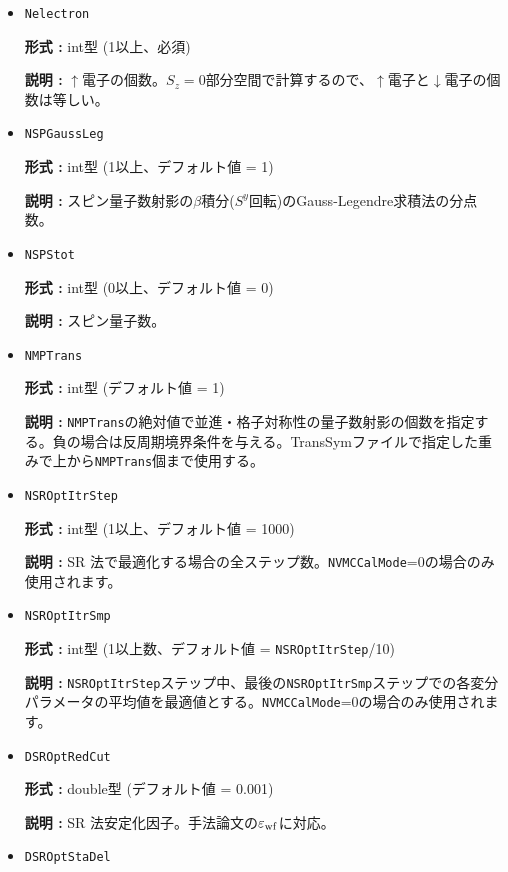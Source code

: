 \begin{itemize}
{\bf 説明 :} サイト数を指定する整数。  

\item  \verb|Nelectron|

{\bf 形式 :} {int型 (1以上、必須)}

{\bf 説明 :} $\uparrow$電子の個数。$S_z=0$部分空間で計算するので、$\uparrow$電子と$\downarrow$電子の個数は等しい。

 \item  \verb|NSPGaussLeg|

{\bf 形式 :} {int型 (1以上、デフォルト値 = 1)}

{\bf 説明 :} スピン量子数射影の$\beta$積分($S^y$回転)のGauss-Legendre求積法の分点数。

 \item  \verb|NSPStot|

{\bf 形式 :} int型 (0以上、デフォルト値 = 0)

{\bf 説明 :}  スピン量子数。

 \item  \verb|NMPTrans|

{\bf 形式 :} int型 (デフォルト値 = 1)

{\bf 説明 :} 
\verb|NMPTrans|の絶対値で並進・格子対称性の量子数射影の個数を指定する。負の場合は反周期境界条件を与える。TransSymファイルで指定した重みで上から\verb|NMPTrans|個まで使用する。

 \item  \verb|NSROptItrStep|

{\bf 形式 :} int型 (1以上、デフォルト値 = 1000)

{\bf 説明 :} 
SR 法で最適化する場合の全ステップ数。\verb|NVMCCalMode|=0の場合のみ使用されます。
 
 \item  \verb|NSROptItrSmp|

{\bf 形式 :} int型 (1以上数、デフォルト値 = \verb|NSROptItrStep|/10)

{\bf 説明 :} \verb|NSROptItrStep|ステップ中、最後の\verb|NSROptItrSmp|ステップでの各変分パラメータの平均値を最適値とする。\verb|NVMCCalMode|=0の場合のみ使用されます。

\item   \verb|DSROptRedCut|
   
{\bf 形式 :} double型 (デフォルト値 = 0.001)

{\bf 説明 :} SR 法安定化因子。手法論文\cite{Tahara2008}の$\varepsilon_{\rm wf}$に対応。

 \item  \verb|DSROptStaDel| 
   

\end{itemize}
